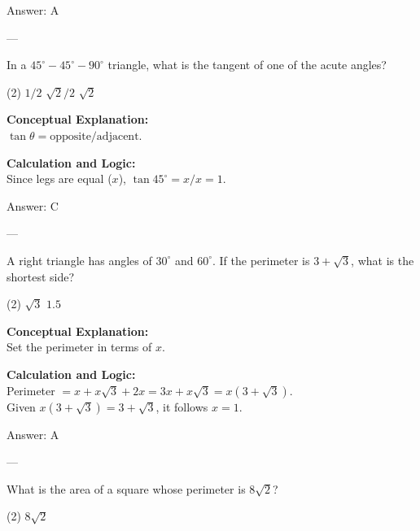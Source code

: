 \documentclass[11pt,paper=a4,answers]{exam}
\begin{document}
\begin{questions}
\begin{solution}
\vspace{15pt}
Answer: \colorbox{yellow!100}{A}
\end{solution}

---

\question
In a $45^\circ-45^\circ-90^\circ$ triangle, what is the tangent of one of the acute angles?
\begin{tasks}(2)
    \task $1/2$
    \task $\sqrt{2}/2$
    \task $\sqrt{2}$
\end{tasks}

\begin{solution}
\textbf{Conceptual Explanation:} \\
$\tan \theta = \text{opposite} / \text{adjacent}$.

\vspace{10pt}
\textbf{Calculation and Logic:} \\
Since legs are equal ($x$), $\tan 45^\circ = x/x = 1$.

\vspace{15pt}
Answer: \colorbox{yellow!100}{C}
\end{solution}

---

\question
A right triangle has angles of $30^\circ$ and $60^\circ$. If the perimeter is $3 + \sqrt{3}$, what is the shortest side?
\begin{tasks}(2)
    \task $\sqrt{3}$
    \task $1.5$
\end{tasks}

\begin{solution}
\textbf{Conceptual Explanation:} \\
Set the perimeter in terms of $x$.

\vspace{10pt}
\textbf{Calculation and Logic:} \\
Perimeter $= x + x\sqrt{3} + 2x = 3x + x\sqrt{3} = x(3 + \sqrt{3})$. \\
Given $x(3 + \sqrt{3}) = 3 + \sqrt{3}$, it follows $x = 1$.

\vspace{15pt}
Answer: \colorbox{yellow!100}{A}
\end{solution}

---

\question
What is the area of a square whose perimeter is $8\sqrt{2}$?
\begin{tasks}(2)
    \task $8\sqrt{2}$
\end{tasks}


\end{questions}
\end{document}
